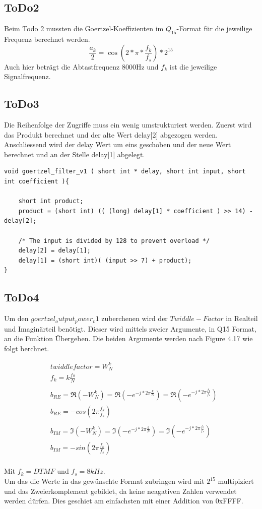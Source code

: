 \documentclass[a4paper,11pt]{article}
\begin{document}
\subsection{ToDo2}
Beim Todo 2 mussten die Goertzel-Koeffizienten im $Q_{15}$-Format für die jeweilige Frequenz berechnet werden.
\begin{equation}\label{eq:Goertzel_Koeff}
	\frac{a_k}{2}= \cos(2*\pi*\frac{f_k}{f_s})*2^{15}
\end{equation}
Auch hier beträgt die Abtastfrequenz 8000Hz und $f_k$ ist die jeweilige Signalfrequenz.

\subsection{ToDo3}
Die Reihenfolge der Zugriffe muss ein wenig umstrukturiert werden. Zuerst wird das Produkt berechnet und der alte Wert delay[2] abgezogen werden. Anschliessend wird der delay Wert um eins geschoben und der neue Wert berechnet und an der Stelle delay[1] abgelegt. 
\begin{lstlisting}
void goertzel_filter_v1 ( short int * delay, short int input, short int coefficient ){
	
	short int product;
	product = (short int) (( (long) delay[1] * coefficient ) >> 14) - delay[2];

	/* The input is divided by 128 to prevent overload */
	delay[2] = delay[1];
	delay[1] = (short int)( (input >> 7) + product);
}
\end{lstlisting}

\subsection{ToDo4}
Um den $goertzel_output_power_v1$ zuberchenen wird der $Twiddle-Factor$ in Realteil und Imaginärteil benötigt. Dieser wird mittels zweier Argumente, in Q15 Format, an die Funktion Übergeben. Die beiden Argumente werden nach Figure 4.17 wie folgt berchnet.

\begin{align*}
	&twiddlefactor = W^{k}_{N} \\
	&f_k = k\frac{fs}{N} \\\\
	&b_{RE} =\Re{(-W^{k}_{N})} = \Re{(-e^{-j*2\pi \frac{k}{N}})}=  \Re{(-e^{-j*2\pi \frac{f_k}{f_s}})}\\
	&b_{RE} = -cos(2\pi\frac{f_k}{f_s})\\\\
	&b_{IM} =\Im{(-W^{k}_{N})} = \Im{(-e^{-j*2\pi \frac{k}{N}})}=  \Im{(-e^{-j*2\pi \frac{f_k}{f_s}})}\\
	&b_{IM} = -sin(2\pi\frac{f_k}{f_s})
\end{align*}
\\
Mit $f_k = DTMF$ und $f_s = 8kHz$.
\\
Um das die Werte in das gewünschte Format zubringen wird mit $2^{15}$ multipiziert und das Zweierkomplement gebildet, da keine neagativen Zahlen verwendet werden dürfen. Dies geschiet am einfachsten mit einer Addition von 0xFFFF.
\end{document}
